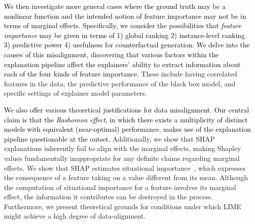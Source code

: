 \documentclass[mnsc,blindrev]{informs3}
\begin{document}
\textcolor{black}{We then investigate more general cases where the ground truth may be a nonlinear function and the intended notion of feature importance may not be in terms of marginal effects. Specifically, we consider the possibilities that \emph{feature importance} may be given in terms of 1) global ranking 2) instance-level ranking 3) predictive power 4) usefulness for counterfactual generation. We delve into the causes of this misalignment, discovering that various factors within the explanation pipeline affect the explainers' ability to extract information about each of the four kinds of feature importance.} These include having correlated features in the data, the predictive performance of the black box model, and specific settings of explainer model parameters. %

\textcolor{black}{We also offer various theoretical justifications for data misalignment}.
\textcolor{black}{Our central claim is that the \emph{Rashomon effect}, in which there exists a multiplicity of distinct models with equivalent (near-optimal) performance, makes use of the explanation pipeline questionable at the outset.} Additionally, we show that SHAP explanations inherently fail to align with the marginal effects, making Shapley values fundamentally inappropriate for any definite claims regarding marginal effects. We show that SHAP estimates situational importance~\citep{StrumbeljErik2014Epma}, 
 which expresses the consequence of a feature taking on a value different from its mean. Although the computation of situational importance for a feature involves its marginal effect, the information it contributes can be destroyed in the process. Furthermore, we present theoretical grounds for conditions under which LIME might achieve a high degree of data-alignment.


\end{document}

